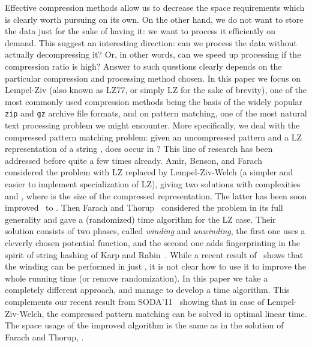 \documentclass[runningheads]{llncs}
\begin{document}
Effective compression methods allow us to decrease the space requirements which is clearly worth pursuing on its own. On the other hand, we do not want to store the data just for the sake of having it: we want to process it efficiently on demand. This suggest an interesting direction: can we process the data without actually decompressing it? Or, in other words, can we speed up processing if the compression ratio is high? Answer to such questions clearly depends on the particular compression and processing method chosen. In this paper we focus on Lempel-Ziv (also known as LZ77, or simply LZ for the sake of brevity), one of the most commonly used compression methods being the basis of the widely popular \texttt{zip} and \texttt{gz} archive file formats, and on pattern matching, one of the most natural text processing problem we might encounter. More specifically, we deal with the compressed pattern matching problem: given an uncompressed pattern  and a LZ representation of a string , does  occur in ? This line of research has been addressed before quite a few times already. Amir, Benson, and Farach~\cite{Amir} considered the problem with LZ replaced by Lempel-Ziv-Welch (a simpler and easier to implement specialization of LZ), giving two solutions with complexities  and , where  is the size of the compressed representation. The latter has been soon improved~\cite{Kosaraju} to . Then Farach and Thorup~\cite{Farach} considered the problem in its full generality and gave a (randomized)  time algorithm for the LZ case. Their solution consists of two phases, called {\it winding} and {\it unwinding}, the first one uses a cleverly chosen potential function, and the second one adds fingerprinting in the spirit of string hashing of Karp and Rabin~\cite{KarpRabin}. While a recent result of~\cite{Iacono} shows that the winding can be performed in just , it is not clear how to use it to improve the whole running time (or remove randomization).  In this paper we take a completely different approach, and manage to develop a  time algorithm. This complements our recent result from SODA'11~\cite{GawrychowskiLZW} showing that in case of Lempel-Ziv-Welch, the compressed pattern matching can be solved in optimal linear time. The space usage of the improved algorithm is the same as in the solution of Farach and Thorup, .
\end{document}
